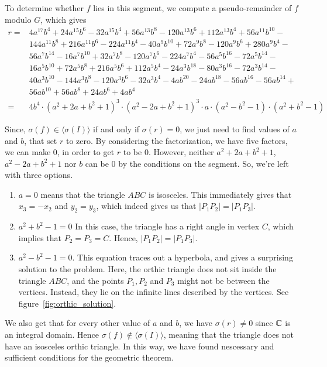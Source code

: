 \begin{example}
  To determine whether $f$ lies in this segment, we compute a pseudo-remainder of $f$ modulo $G$, which gives
  \begin{align*}
    r = &4 a^{17} b^4 + 24 a^{15} b^6 - 32 a^{15} b^4 + 56 a^{13} b^8 - 120 a^{13} b^6 + 112 a^{13} b^4 + 56 a^{11} b^{10} - \\
        &144 a^{11} b^8 + 216 a^{11} b^6 - 224 a^{11} b^4 - 40 a^9 b^{10} + 72 a^9 b^8 - 120 a^9 b^6 + 280 a^9 b^4 - \\
        &56 a^7 b^{14} - 16 a^7 b^{10} + 32 a^7 b^8 - 120 a^7 b^6 - 224 a^7 b^4 - 56 a^5 b^{16} - 72 a^5 b^{14} - \\
        &16 a^5 b^{10} + 72 a^5 b^8 + 216 a^5 b^6 + 112 a^5 b^4 - 24 a^3 b^{18} - 80 a^3 b^{16} - 72 a^3 b^{14} - \\
        &40 a^3 b^{10} - 144 a^3 b^8 - 120 a^3 b^6 - 32 a^3 b^4 - 4 a b^{20} - 24 a b^{18} - 56 a b^{16} - 56 a b^{14} + \\
        &56 a b^{10} + 56 a b^8 + 24 a b^6 + 4 a b^4 \\
    = &4 b^{4}\cdot (a^{2} + 2a + b^{2} + 1)^{3} \cdot (a^{2} - 2a + b^{2} + 1)^{3} \cdot a \cdot (a^{2} - b^{2} - 1) \cdot (a^{2} + b^{2} - 1)
  \end{align*}

  Since, $\sigma(f) \in \langle \sigma(I) \rangle$ if and only if $\sigma(r) = 0$, we just need to find values of $a$ and $b$, that set $r$ to zero. By considering the factorization, we have five factors, we can make 0, in order to get $r$ to be 0. However, neither $a^{2} + 2a + b^{2} + 1$, $a^{2} - 2a + b^{2} + 1$ nor $b$ can be $0$ by the conditions on the segment. So, we're left with three options.
  \begin{enumerate}
    \item $a = 0$ means that the triangle $ABC$ is isosceles. This immediately gives that $x_{3} = -x_{2}$ and $y_{2} = y_{3}$, which indeed gives us that $|P_{1}P_{2}| = |P_{1}P_{3}|$.
    \item $a^{2} + b^{2} - 1 = 0$ In this case, the triangle has a right angle in vertex $C$, which implies that $P_{2} = P_{3} = C$. Hence, $|P_{1}P_{2}| = |P_{1}P_{3}|$.
          \item $a^{2} - b^{2} - 1 = 0$. This equation traces out a hyperbola, and gives a surprising solution to the problem. Here, the orthic triangle does not sit inside the triangle $ABC$, and the points $P_{1}, P_{2}$ and $P_{3}$ might not be between the vertices. Instead, they lie on the infinite lines described by the vertices. See figure~\ref{fig:orthic_solution}.
  \end{enumerate}

  We also get that for every other value of $a$ and $b$, we have $\sigma(r) \neq 0$ since $\mathbb{C}$ is an integral domain. Hence $\sigma(f) \notin \langle \sigma(I) \rangle$, meaning that the triangle does not have an isosceles orthic triangle. In this way, we have found nescessary and sufficient conditions for the geometric theorem.
\end{example}

